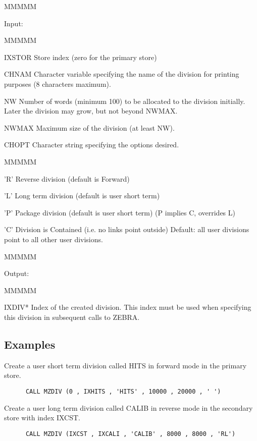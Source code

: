 \begin{DL}{MMMMM}
\item[Input:
]
\begin{DL}{MMMMM}
\item[IXSTOR
]Store index (zero for the primary store)
\item[CHNAM
]Character variable specifying the
name of the division for printing purposes
(8 characters maximum).
\item[NW
]Number of words (minimum 100) to be allocated to the division
initially. Later the division
may grow, but not beyond NWMAX.
\item[NWMAX
]Maximum size of the division (at least NW).
\item[CHOPT
]Character string specifying the options desired.
\begin{DL}{MMMMM}
\item['R'
]Reverse division (default is Forward)
\item['L'
]Long term division (default is user short term)
\item['P'
]Package division (default is user short term)
\newline (P implies C, overrides L)
\item['C'
]Division is Contained (i.e. no links point outside)
\newline Default: all user divisions point to all other user divisions.
\end{DL}
\end{DL}
\end{DL}
\begin{DL}{MMMMM}
\item[Output:
]
\begin{DL}{MMMMM}
\item[IXDIV*
]Index of the created division. This index
must be used when specifying this division in subsequent calls
to ZEBRA.
\end{DL}
\end{DL}
\subsection{Examples}
\par Create a user short term division called HITS in
forward mode in the primary store.
\begin{verbatim}
      CALL MZDIV (0 , IXHITS , 'HITS' , 10000 , 20000 , ' ')
\end{verbatim}
\par Create a user long term division called CALIB in
reverse mode in the secondary store with index IXCST.
\begin{verbatim}
      CALL MZDIV (IXCST , IXCALI , 'CALIB' , 8000 , 8000 , 'RL')
\end{verbatim}
